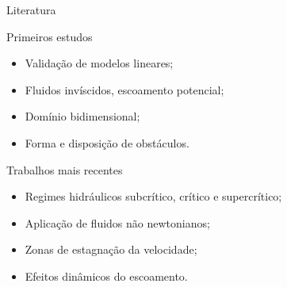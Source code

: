 

\begin{frame}{Literatura}
    \begin{minipage}[c]{0.49\textwidth}
        \begin{exampleblock}{Primeiros estudos}
            \begin{itemize}
                \item Validação de modelos lineares;
                \item Fluidos invíscidos, escoamento potencial;
                \item Domínio bidimensional;
                \item Forma e disposição de obstáculos.
            \end{itemize}
        \end{exampleblock}
    \end{minipage}
    \hfill
    \begin{minipage}[c]{0.49\textwidth}
        \begin{exampleblock}{Trabalhos mais recentes}
            \begin{itemize}
                \item Regimes hidráulicos subcrítico, crítico e supercrítico;
                \item Aplicação de fluidos não newtonianos;
                \item Zonas de estagnação da velocidade;
                \item Efeitos dinâmicos do escoamento.
            \end{itemize}
        \end{exampleblock}
    \end{minipage}
        
\end{frame}

